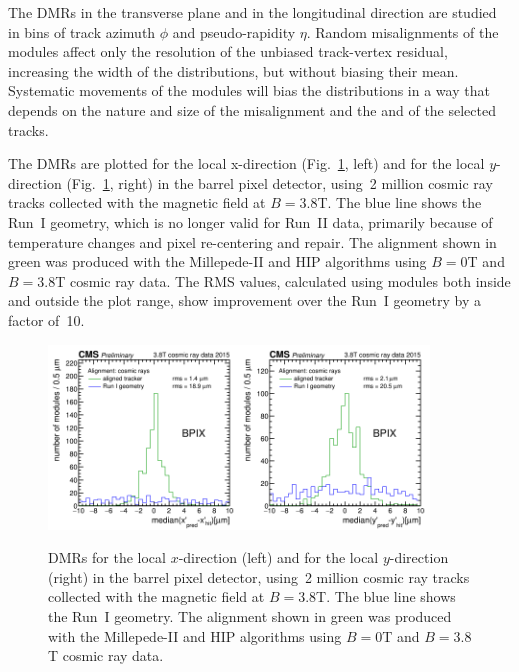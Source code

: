 The DMRs in the transverse plane and in the longitudinal direction are studied in bins of track azimuth $\phi$ and pseudo-rapidity $\eta$. Random misalignments of the modules affect only the resolution of the unbiased track-vertex residual, increasing the width of the distributions, but without biasing their mean. Systematic movements of the modules will bias the distributions in a way that depends on the nature and size of the misalignment and the and of the selected tracks.

The DMRs are plotted for the local x-direction (Fig.~\ref{fig:DMRs}, left) and for the local $y$-direction (Fig.~\ref{fig:DMRs}, right) in the barrel pixel detector, using~2 million cosmic ray tracks collected with the magnetic field at $B=3.8$T. The blue line shows the Run~I geometry, which is no longer valid for Run~II data, primarily because of temperature changes and pixel re-centering and repair. The alignment shown in green was produced with the Millepede-II and HIP algorithms using $B=0$T and $B=3.8$T cosmic ray data. The RMS values, calculated using modules both inside and outside the plot range, show improvement over the Run~I geometry by a factor of~10.

\begin{figure}[htb]
    \begin{center}
        \includegraphics[width=0.45\textwidth]{../figs/Alignment/AlRes_CRAFT_DmedianR_BPIX_plain.png}\includegraphics[width=0.45\textwidth]{../figs/Alignment/AlRes_CRAFT_DmedianYR_BPIX_plain.png}
    \end{center}
    \caption {DMRs for the local $x$-direction (left) and for the local $y$-direction (right) in the barrel pixel detector, using~2 million cosmic ray tracks collected with the magnetic field at $B=3.8$T. The blue line shows the Run~I geometry. The alignment shown in green was produced with the Millepede-II and HIP algorithms using $B=0$T and $B=3.8$T cosmic ray data.}
    \label{fig:DMRs}
\end{figure}

